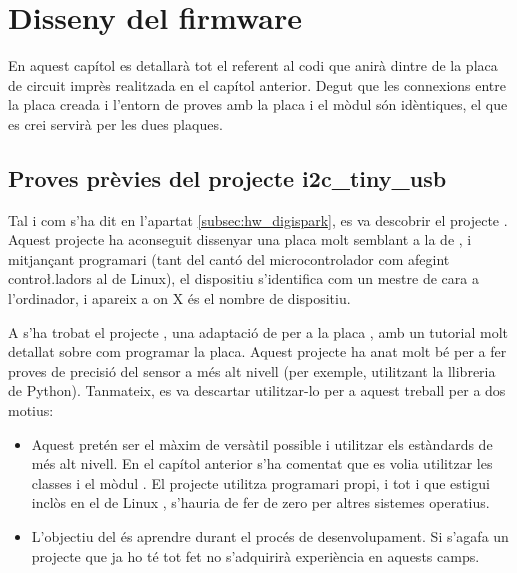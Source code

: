 \chapter{Disseny del firmware}

En aquest capítol es detallarà tot el referent al codi que anirà dintre de la
placa de circuit imprès realitzada en el capítol anterior. Degut que les
connexions entre la placa creada i l'entorn de proves amb la placa 
i el mòdul  són idèntiques, el  que es crei servirà
per les dues plaques.

\section{Proves prèvies del projecte i2c\_tiny\_usb}
\label{sec:testinc-i2c-tiny}

Tal i com s'ha dit en l'apartat \ref{subsec:hw_digispark}, es va descobrir
el projecte  \cite{I2cTinyUsb}.
Aquest projecte ha aconseguit dissenyar
una placa molt semblant a la de , i mitjançant programari (tant
del cantó del microcontrolador com afegint contro\l.ladors al  de
Linux), el dispositiu s'identifica com un mestre  de cara a
l'ordinador, i apareix a  on X és el nombre de dispositiu.

A \cite{i2cOnLittleWireBuilding} s'ha trobat el projecte
, una adaptació de
 per a la placa , amb un tutorial molt
detallat sobre com programar la placa.
Aquest projecte ha anat molt bé per a fer proves de precisió del sensor a més
alt nivell (per exemple, utilitzant la llibreria  de Python). Tanmateix,
es va descartar utilitzar-lo per a aquest treball per a dos motius:

\begin{itemize}
    \item Aquest  pretén ser el màxim de versàtil possible i utilitzar
    els estàndards de més alt nivell. En el capítol anterior s'ha comentat que
    es volia utilitzar les classes  i el mòdul . El projecte
     utilitza programari propi, i tot i que estigui inclòs
    en el  de Linux \cite{I2cTinyKernel}, s'hauria de fer de zero per altres sistemes
    operatius.
    \item L'objectiu del  és aprendre durant el procés de
    desenvolupament. Si s'agafa un projecte que ja ho té tot fet no s'adquirirà
    experiència en aquests camps.
\end{itemize}


